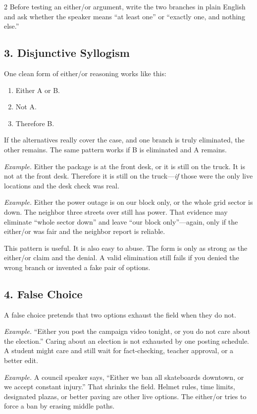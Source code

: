 \documentclass[12pt]{article}
\newcommand{\exbox}[1]{\par\vspace{0.2em}\noindent\textit{Example.} #1\par\vspace{0.15em}}
\begin{document}
\begin{multicols}{2}
Before testing an either/or argument, write the two branches in plain English and ask whether the speaker means ``at least one'' or ``exactly one, and nothing else.''

\subsection*{3. Disjunctive Syllogism}
One clean form of either/or reasoning works like this:
\begin{enumerate}[leftmargin=*,itemsep=0.08em]
\item Either A or B.
\item Not A.
\item Therefore B.
\end{enumerate}

If the alternatives really cover the case, and one branch is truly eliminated, the other remains. The same pattern works if B is eliminated and A remains.

\exbox{Either the package is at the front desk, or it is still on the truck. It is not at the front desk. Therefore it is still on the truck---\textit{if} those were the only live locations and the desk check was real.}

\exbox{Either the power outage is on our block only, or the whole grid sector is down. The neighbor three streets over still has power. That evidence may eliminate ``whole sector down'' and leave ``our block only''---again, only if the either/or was fair and the neighbor report is reliable.}

This pattern is useful. It is also easy to abuse. The form is only as strong as the either/or claim and the denial. A valid elimination still fails if you denied the wrong branch or invented a fake pair of options.

\subsection*{4. False Choice}
A false choice pretends that two options exhaust the field when they do not.

\exbox{``Either you post the campaign video tonight, or you do not care about the election.'' Caring about an election is not exhausted by one posting schedule. A student might care and still wait for fact-checking, teacher approval, or a better edit.}

\exbox{A council speaker says, ``Either we ban all skateboards downtown, or we accept constant injury.'' That shrinks the field. Helmet rules, time limits, designated plazas, or better paving are other live options. The either/or tries to force a ban by erasing middle paths.}


\end{multicols}
\end{document}
